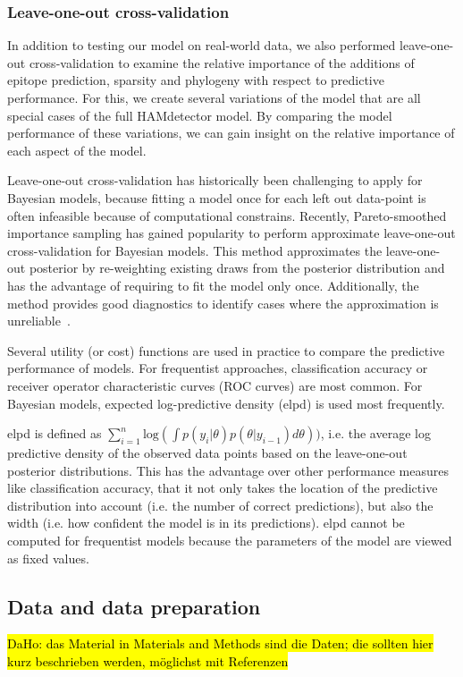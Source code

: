 \documentclass{bioinfo}
\begin{document}
\begin{methods}
  \subsubsection{Leave-one-out cross-validation}

  In addition to testing our model on real-world data, we also performed leave-one-out cross-validation to examine the relative importance of the additions of epitope prediction, sparsity and phylogeny with respect to predictive performance.
  For this, we create several variations of the model that are all special cases of the full HAMdetector model.
  By comparing the model performance of these variations, we can gain insight on the relative importance of each aspect of the model.
  
  Leave-one-out cross-validation has historically been challenging to apply for Bayesian models, because fitting a model once for each left out data-point is often infeasible because of computational constrains.
  Recently, Pareto-smoothed importance sampling has gained popularity to perform approximate leave-one-out cross-validation for Bayesian models. This method  approximates the leave-one-out posterior by re-weighting existing draws from the posterior distribution and has the advantage of requiring to fit the model only once. Additionally, the method provides good diagnostics to identify cases where the approximation is unreliable~\cite{Vehtari2016}.

  Several utility (or cost) functions are used in practice to compare the predictive performance of models. For frequentist approaches, classification accuracy or receiver operator characteristic curves (ROC curves) are most common.
  For Bayesian models, expected log-predictive density (elpd) is used most frequently. 

  elpd is defined as \(\sum_{i=1}^{n}\text{log}(\int p(y_i|\theta)p(\theta|y_{i-1})d\theta))\), i.e. the average log predictive density of the observed data points based on the leave-one-out posterior distributions.
  This has the advantage over other performance measures like classification accuracy, that it not only takes the location of the predictive distribution into account (i.e. the number of correct predictions), but also the width (i.e. how confident the model is in its predictions).
  elpd cannot be computed for frequentist models because the parameters of the model are viewed as fixed values.

  \subsection{Data and data preparation}
 \hl{DaHo: das Material in Materials and Methods sind die Daten; die sollten hier kurz beschrieben werden, möglichst mit Referenzen}


\end{methods}
\end{document}
